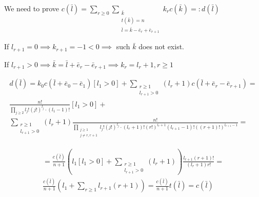 \documentclass{article}
\begin{document}
We need to prove \( c(\bar{l}) = \sum_{r \geq 0} \sum_{\substack{\bar{k}\\ t(\bar{k}) = n \\ \bar{l} = \bar{k} - \bar{e}_{r} + \bar{e}_{r+1}}} k_{r} c(\bar{k}) =: d(\bar{l}) \)

If \( l_{r+1} = 0 \implies k_{r+1} = -1 < 0 \implies \) such \( \bar{k} \) does not exist.

If \( l_{r+1} > 0 \implies \bar{k} = \bar{l} + \bar{e}_{r} - \bar{e}_{r + 1} \implies k_{r} = l_{r} + 1, r \geq 1 \)

\begin{multline*}
d(\bar{l}) = k_{0} c(\bar{l} + \bar{e}_{0} - \bar{e}_{1})[l_{1} > 0] + \sum_{\substack{r \geq 1\\ l_{r+1} > 0}} (l_{r} + 1) c(\bar{l} + \bar{e}_{r} - \bar{e}_{r + 1}) = \\
\frac{n!}{\prod_{j \geq 2} l_{j}!{(j!)}^{l_{j}} \cdot (l_{1}-1)!}[l_{1} > 0] + \\
\sum_{\substack{r \geq 1\\ l_{r+1} > 0}} (l_{r} + 1) \frac{n!}{\prod_{\substack{j \geq 1 \\ j \neq r, r+1}} l_{j}!{(j!)}^{l_{j}} \cdot (l_{r}+1)!{(r!)}^{l_{r}+1} (l_{r+1}-1)!{((r+1)!)}^{l_{r+1}-1}} =
\end{multline*}

\begin{multline*}
= \frac{c(\bar{l})}{n+1} (l_{1} [l_{1} > 0] + \sum_{\substack{r \geq 1 \\ l_{r+1} > 0}} (l_{r} + 1)) \frac{l_{r+1} (r+1)!}{(l_{r} + 1)r!} = \\
\frac{c(\bar{l})}{n+1}(l_{1} + \sum_{r \geq 1} l_{r+1}(r+1)) = \frac{c(\bar{l})}{n+1} t(\bar{l}) = c(\bar{l})
\end{multline*}
\end{document}
